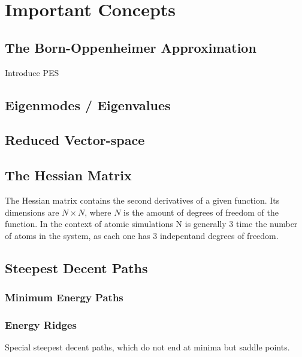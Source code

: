 \section{Important Concepts}
\subsection{The Born-Oppenheimer Approximation}
\bit
\item Introduce PES
\eit
\placeholder

\subsection{Eigenmodes / Eigenvalues}
\placeholder

\subsection{Reduced Vector-space}
\placeholder

\subsection{The Hessian Matrix}
The Hessian matrix contains the second derivatives of a given function.
Its dimensions are $N\times N$, where $N$ is the amount of degrees of freedom of the function.
In the context of atomic simulations N is generally 3 time the number of atoms in the system, as each one has 3 indepentand degrees of freedom.
\incomplete

\subsection{Steepest Decent Paths}
\placeholder
\subsubsection{Minimum Energy Paths}
\placeholder
\subsubsection{Energy Ridges}
Special steepest decent paths, which do not end at minima but saddle points.
\placeholder
